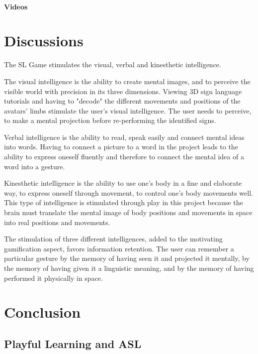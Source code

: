 \paragraph{Videos}


\section{Discussions}

The SL Game stimulates the visual, verbal and kinesthetic intelligence. 

The visual intelligence is the ability to create mental images, and to perceive the visible world with precision in its three dimensions. Viewing 3D sign language tutorials and having to "decode" the different movements and positions of the avatars' limbs stimulate the user's visual intelligence. The user needs to perceive, to make a mental projection before re-performing the identified signs.

Verbal intelligence is the ability to read, speak easily and connect mental ideas into words. Having to connect a picture to a word in the project leads to the ability to express oneself fluently and therefore to connect the mental idea of a word into a gesture. 

Kinesthetic intelligence is the ability to use one's body in a fine and elaborate way, to express oneself through movement, to control one's body movements well. This type of intelligence is stimulated through play in this project because the brain must translate the mental image of body positions and movements in space into real positions and movements. 

The stimulation of three different intelligences, added to the motivating gamification aspect, favors information retention. The user can remember a particular gesture by the memory of having seen it and projected it mentally, by the memory of having given it a linguistic meaning, and by the memory of having performed it physically in space.

\section{Conclusion}

\subsection{Playful Learning and ASL}

